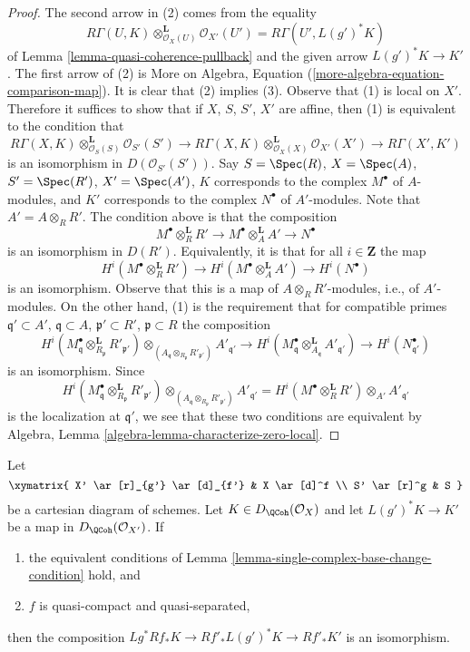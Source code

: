 \begin{proof}
The second arrow in (2) comes from the equality
$$
R\Gamma(U, K) \otimes_{\mathcal{O}_X(U)}^\mathbf{L} \mathcal{O}_{X'}(U') =
R\Gamma(U', L(g')^*K)
$$
of Lemma \ref{lemma-quasi-coherence-pullback} and the given arrow
$L(g')^*K \to K'$. The first arrow of (2) is
More on Algebra, Equation (\ref{more-algebra-equation-comparison-map}).
It is clear that (2) implies (3). Observe that (1) is local on $X'$.
Therefore it suffices to show that if $X$, $S$, $S'$, $X'$ are affine, then
(1) is equivalent to the condition that
$$
R\Gamma(X, K) \otimes_{\mathcal{O}_S(S)}^\mathbf{L} \mathcal{O}_{S'}(S')
\to
R\Gamma(X, K) \otimes_{\mathcal{O}_X(X)}^\mathbf{L} \mathcal{O}_{X'}(X')
\to
R\Gamma(X', K')
$$
is an isomorphism in $D(\mathcal{O}_{S'}(S'))$. Say
$S = \Spec(R)$, $X = \Spec(A)$, $S' = \Spec(R')$, $X' = \Spec(A')$,
$K$ corresponds to the complex $M^\bullet$ of $A$-modules, and
$K'$ corresponds to the complex $N^\bullet$ of $A'$-modules.
Note that $A' = A \otimes_R R'$. The condition above is that the composition
$$
M^\bullet \otimes_R^\mathbf{L} R' \to
M^\bullet \otimes_A^\mathbf{L} A' \to
N^\bullet
$$
is an isomorphism in $D(R')$. Equivalently, it is that for all
$i \in \mathbf{Z}$ the map
$$
H^i(M^\bullet \otimes_R^\mathbf{L} R') \to
H^i(M^\bullet \otimes_A^\mathbf{L} A') \to
H^i(N^\bullet)
$$
is an isomorphism. Observe that this is a map of $A \otimes_R R'$-modules,
i.e., of $A'$-modules. On the other hand, (1) is the requirement
that for compatible primes
$\mathfrak q' \subset A'$, $\mathfrak q \subset A$,
$\mathfrak p' \subset R'$, $\mathfrak p \subset R$
the composition
$$
H^i(M^\bullet_\mathfrak q \otimes_{R_\mathfrak p}^\mathbf{L} R'_{\mathfrak p'})
\otimes_{(A_\mathfrak q \otimes_{R_\mathfrak p} R'_{\mathfrak p'})}
A'_{\mathfrak q'} \to
H^i(M^\bullet_{\mathfrak q}
\otimes_{A_\mathfrak q}^\mathbf{L} A'_{\mathfrak q'})
\to H^i(N^\bullet_{\mathfrak q'})
$$
is an isomorphism. Since
$$
H^i(M^\bullet_\mathfrak q \otimes_{R_\mathfrak p}^\mathbf{L} R'_{\mathfrak p'})
\otimes_{(A_\mathfrak q \otimes_{R_\mathfrak p} R'_{\mathfrak p'})}
A'_{\mathfrak q'} =
H^i(M^\bullet \otimes_R^\mathbf{L} R') \otimes_{A'} A'_{\mathfrak q'}
$$
is the localization at $\mathfrak q'$,
we see that these two conditions are equivalent by
Algebra, Lemma \ref{algebra-lemma-characterize-zero-local}.
\end{proof}

\begin{lemma}
\label{lemma-single-complex-base-change}
Let
$$
\xymatrix{
X' \ar[r]_{g'} \ar[d]_{f'} &
X \ar[d]^f \\
S' \ar[r]^g &
S
}
$$
be a cartesian diagram of schemes. Let $K \in D_\QCoh(\mathcal{O}_X)$
and let $L(g')^*K \to K'$ be a map in $D_\QCoh(\mathcal{O}_{X'})$.
If
\begin{enumerate}
\item the equivalent conditions of
Lemma \ref{lemma-single-complex-base-change-condition} hold, and
\item $f$ is quasi-compact and quasi-separated,
\end{enumerate}
then the composition $Lg^*Rf_*K \to Rf'_*L(g')^*K \to Rf'_*K'$
is an isomorphism.
\end{lemma}

